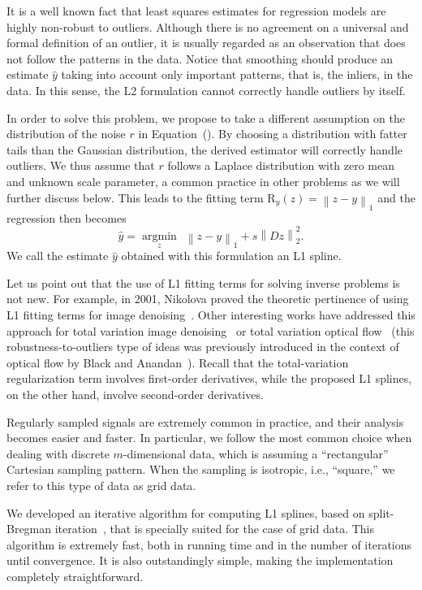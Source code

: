 \documentclass[preprint]{imsart}
\newcommand{\argmin}[1]{\underset{#1}{\operatorname{argmin}}\ }
\newcommand{\funct}[1]{\mathrm{#1}}
\newcommand{\norm}[2]{\left\| #1 \right\|_{#2}}
\begin{document}
It is a well known fact that least squares estimates for regression models are highly non-robust to outliers. Although there is no agreement on a universal and formal definition of an outlier, it is usually regarded as an observation that does not follow the patterns in the data. Notice that smoothing should produce an estimate $\hat{y}$ taking into account only important patterns, that is, the inliers, in the data. In this sense, the L2 formulation cannot correctly handle outliers by itself.

In order to solve this problem, we propose to take a different assumption on the distribution of the noise $r$ in Equation~(). By choosing a distribution with fatter tails than the Gaussian distribution, the derived estimator will correctly handle outliers. We thus assume that $r$ follows a Laplace distribution with zero mean and unknown scale parameter, a common practice in other problems as we will further discuss below. This leads to the fitting term $\funct{R}_ y(z) = \norm{z - y}{1}$ and the regression then becomes
\begin{equation*}
    \hat{y} = \argmin{z} \ \norm{z - y}{1} + s \norm{Dz}{2}^2 .
\end{equation*}
We call the estimate $\hat{y}$ obtained with this formulation an L1 spline.

Let us point out that the use of L1 fitting terms for solving inverse problems is not new.
For example, in 2001, Nikolova proved the theoretic pertinence of using L1 fitting terms for image denoising~\cite{nikolova02}. 
Other interesting works have addressed this approach for total variation image denoising~\cite{alliney97,chan2004,aujol06,nikolova12} or total variation optical flow~\cite{zach07,wedel09,raket11} (this robustness-to-outliers type of ideas was previously introduced in the context of optical flow by Black and Anandan~\cite{black91}). Recall that the total-variation regularization term involves first-order derivatives, while the proposed L1 splines, on the other hand, involve second-order derivatives.

Regularly sampled signals are extremely common in practice, and their analysis becomes easier and faster. In particular, we follow the most common choice when dealing with discrete $m$-dimensional data, which is assuming a ``rectangular'' Cartesian sampling pattern. When the sampling is isotropic, i.e., ``square,'' we refer to this type of data as grid data.

We developed an iterative algorithm for computing L1 splines, based on split-Bregman iteration~\cite{goldstein09}, that is specially suited for the case of grid data. This algorithm is extremely fast, both in running time and in the number of iterations until convergence. It is also outstandingly simple, making the implementation completely straightforward.
\end{document}
